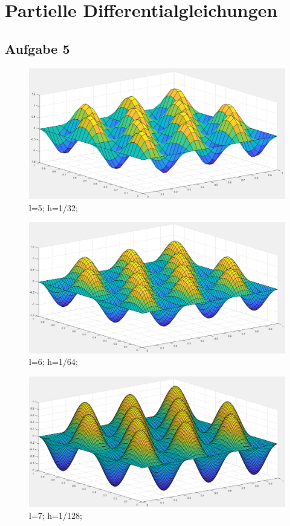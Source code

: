 \documentclass{report}
\begin{document}
\section{Partielle Differentialgleichungen}
    \subsection{Aufgabe 5}
	\begin{figure}
		\includegraphics[width=\linewidth]{Aufgaben-Ressourcen/A5L5M3N2.png} 
		\caption{l=5; h=1/32;}
		\label{A5L5}
	\end{figure}
	\begin{figure}
		\includegraphics[width=\linewidth]{Aufgaben-Ressourcen/A5L6M3N2.png} 
		\caption{l=6; h=1/64;}
		\label{A5L6}
	\end{figure}
	\begin{figure}
		\includegraphics[width=\linewidth]{Aufgaben-Ressourcen/A5L7M3N2.png}
		\caption{l=7; h=1/128;}
		\label{A5L7}
	\end{figure}
\end{document}
